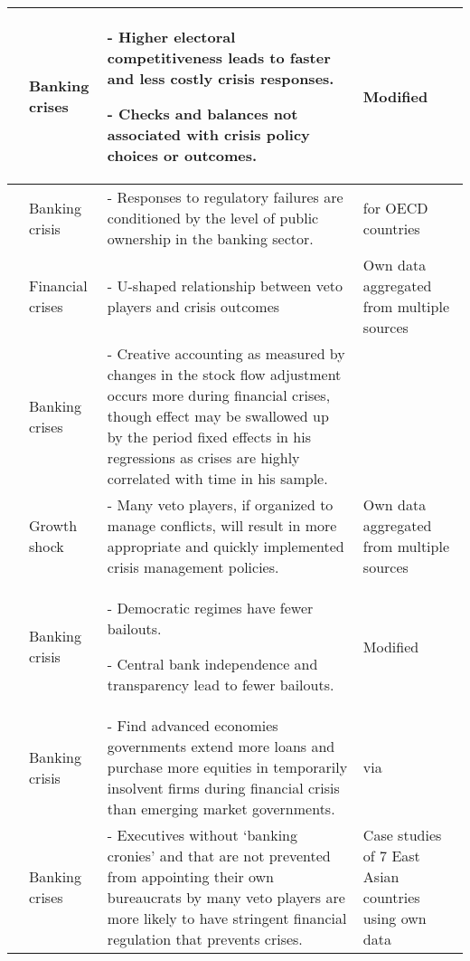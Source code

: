 \begin{tabular}{ m{2.5cm} m{2cm} m{7cm} m{3cm}}
    \cite{Keefer2007} & Banking crises & - Higher electoral competitiveness leads to faster and less costly crisis responses.

    - Checks and balances not associated with crisis policy choices or outcomes. & Modified \cite{Honohan2003} \\[0.25cm]\hline

    \cite{Kleibl2013} & Banking crisis & - Responses to regulatory failures are conditioned by the level of public ownership in the banking sector. & \cite{Laeven2010,Reinhart2009} for OECD countries \\[0.25cm]\hline

    \cite{MacIntyre2001} & Financial crises & - U-shaped relationship between veto players and crisis outcomes & Own data aggregated from multiple sources \\[0.25cm]\hline

    \cite{reischmann2015} & Banking crises & - Creative accounting as measured by changes in the stock flow adjustment occurs more during financial crises, though effect may be swallowed up by the period fixed effects in his regressions as crises are highly correlated with time in his sample. & \cite{Laeven2012} \\[0.25cm]\hline

    \cite{Rodrick1999} & Growth shock & - Many veto players, if organized to manage conflicts, will result in more appropriate and quickly implemented crisis management policies. & Own data aggregated from multiple sources \\[0.25cm]\hline

    \cite{Rosas2006,Rosas2009} & Banking crisis & - Democratic regimes have fewer bailouts.

    - Central bank independence and transparency lead to fewer bailouts. & Modified \cite{Honohan2000} \\[0.25cm]\hline

    \cite{seiferling2015} & Banking crisis & - Find advanced economies governments extend more loans and purchase more equities in temporarily insolvent firms during financial crisis than emerging market governments. & \cite{Laeven2010} via \cite{weber2012} \\[0.25cm]\hline

    \cite{Satayanath2006} & Banking crises & - Executives without `banking cronies' and that are not prevented from appointing their own bureaucrats by many veto players are more likely to have stringent financial regulation that prevents crises. & Case studies of 7 East Asian countries using own data \\[0.25cm]\hline


\end{tabular}
